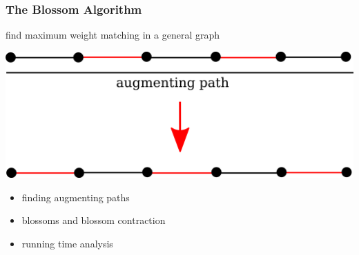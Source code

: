 \documentclass[titlepage,german,presentation]{beamer}
\begin{document}
\begin{frame}
\begin{columns}
\begin{column}{.5\textwidth}
        \end{column}
        \end{columns}





\end{frame}
  
\begin{frame}
\frametitle{ The Blossom Algorithm} %
\begin{block}{}
 find maximum weight matching in a general graph
  \end{block}
\begin{center}
\includegraphics[height=0.25\textwidth]{blossom-matching.png}
\end{center}

\begin{itemize}
\item finding augmenting paths~\cite{Edmonds65}
\item blossoms and blossom contraction~\cite{Edmonds65}
\item running time analysis
\end{itemize}

\end{frame}
\end{document}
